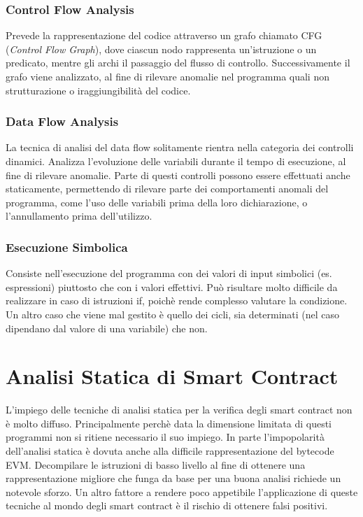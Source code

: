         \subsubsection{Control Flow Analysis}

        Prevede la rappresentazione del codice attraverso un grafo chiamato CFG (\textit{Control Flow Graph}), dove ciascun nodo rappresenta un'istruzione o un predicato, mentre gli archi il passaggio del flusso di controllo.
        Successivamente il grafo viene analizzato, al fine di rilevare anomalie nel programma quali non strutturazione o iraggiungibilità del codice.\newline
        
        \subsubsection{Data Flow Analysis}
        
        La tecnica di analisi del data flow solitamente rientra nella categoria dei controlli dinamici. 
        Analizza l'evoluzione delle variabili durante il tempo di esecuzione, al fine di rilevare anomalie.
        Parte di questi controlli possono essere effettuati anche staticamente, permettendo di rilevare parte dei comportamenti anomali del programma, come l'uso delle variabili prima della loro dichiarazione, o l'annullamento prima dell'utilizzo.\newline
        
        \subsubsection{Esecuzione Simbolica}
        
        Consiste nell'esecuzione del programma con dei valori di input simbolici (es. espressioni) piuttosto che con i valori effettivi. Può risultare molto difficile da realizzare in caso di istruzioni if, poichè rende complesso valutare la condizione. Un altro caso che viene mal gestito è quello dei cicli, sia determinati (nel caso dipendano dal valore di una variabile) che non.\newline

\section{Analisi Statica di Smart Contract}

L'impiego delle tecniche di analisi statica per la verifica degli smart contract non è molto diffuso. Principalmente perchè data la dimensione limitata di questi programmi non si ritiene necessario il suo impiego.\newline
\indent In parte l'impopolarità dell'analisi statica è dovuta anche alla difficile rappresentazione del bytecode EVM. Decompilare le istruzioni di basso livello al fine di ottenere una rappresentazione migliore che funga da base per una buona analisi richiede un notevole sforzo. Un altro fattore a rendere poco appetibile l'applicazione di queste tecniche al mondo degli smart contract è il rischio di ottenere falsi positivi.\newline

